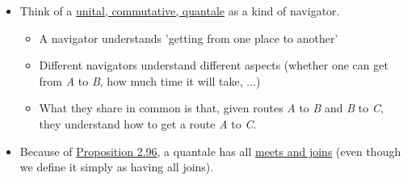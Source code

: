 \begin{itemize}
    \item Think of a \href{doc/1 math/Seven Sketches in Compositionality/Chapter 2: Resource theories/5 Computing presented V-categories with matrix mult/2 Quantales/1 Quantale}{unital, commutative, quantale} as a kind of navigator.
          \begin{itemize}
            \item A navigator understands 'getting from one place to another'
            \item Different navigators understand different aspects (whether one can get from \emph{A} to \emph{B}, how much time it will take, ...)
            \item What they share in common is that, given routes \emph{A} to \emph{B} and \emph{B} to \emph{C}, they understand how to get a route \emph{A} to \emph{C}.
          \end{itemize}
    \item Because of \href{doc/1 math/Seven Sketches in Compositionality/Chapter 2: Resource theories/5 Computing presented V-categories with matrix mult/2 Quantales/3 All joins implies all meets}{Proposition 2.96}, a quantale has all \href{doc/1 math/Seven Sketches in Compositionality/Chapter 1: Generative Effects/5 Meets and joins/1 Definition and basic examples/Meet and join}{meets and joins} (even though we define it simply as having all joins).
  \end{itemize}
